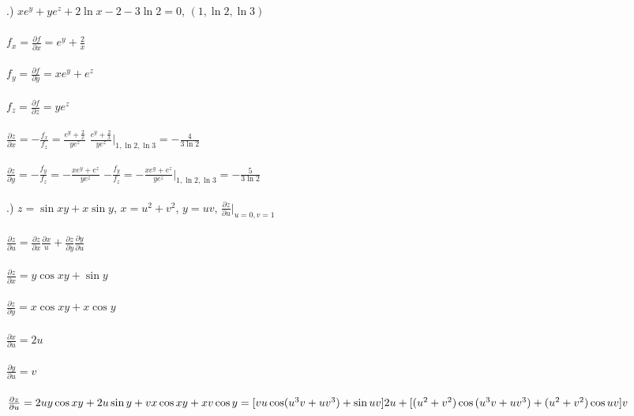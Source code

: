\documentclass[12pt]{article}
\begin{document}
.) $xe^{y} + ye^{z} + 2\ln{x}-2 -3\ln{2} = 0$, \hspace{10pt} $(1, \ln{2}, \ln{3})$\\\\
\noindent $f_{x} = \frac{\partial f}{\partial x} = e^{y}+\frac{2}{x}$\\\\
\noindent $f_{y} = \frac{\partial f}{\partial y} = xe^{y}+e^{z}$\\\\
\noindent $f_{z} = \frac{\partial f}{\partial z} = ye^{z}$\\\\
\noindent $\frac{\partial z}{\partial x} = -\frac{f_{x}}{f_{z}} = \frac{e^{y}+\frac{2}{x}}{ye^{z}}$
\noindent $\frac{e^{y}+\frac{2}{x}}{ye^{z}}\Big|_{1, \ln{2}, \ln{3}} = -\frac{4}{3\ln{2}}$\\\\
\noindent $\frac{\partial z}{\partial y} = -\frac{f_{y}}{f_{z}} = -\frac{xe^{y}+e^{z}}{ye^{z}}$
\noindent $-\frac{f_{y}}{f_{z}} = -\frac{xe^{y}+e^{z}}{ye^{z}}\Big|_{1, \ln{2}, \ln{3}} = -\frac{5}{3\ln{2}}$\\\\

.)  \hspace{10pt}$z = \sin{xy} + x\sin{y}$, \hspace{10pt} $x = u^{2} 
+ v^{2}$, \hspace{10pt} $y = uv$, \hspace{10pt} $\frac{\partial z}{\partial u} \Big|_{u = 0, v=1}$\\\\
\noindent $\frac{\partial z}{\partial u} = \frac{\partial z}{\partial x}\frac{\partial x}{u} 
+ \frac{\partial z}{\partial y}\frac{\partial y}{\partial u}$\\\\
\noindent $\frac{\partial z}{\partial x} = y\cos{xy} + \sin{y}$\\\\
\noindent $\frac{\partial z}{\partial y} = x\cos{xy} + x\cos{y}$\\\\
\noindent $\frac{\partial x}{\partial u} = 2u$\\\\
\noindent $\frac{\partial y}{\partial u} = v$\\\\

\noindent $\frac{\partial z}{\partial u} = 2uy\cos{xy} + 2u\sin{y} + vx\cos{xy} + xv\cos{y}
\\\\= [vu\cos(u^{3}v + uv^{3}) + \sin{uv}]2u + [(u^{2}+v^{2})\cos{(u^{3}v + uv^{3}) + (u^{2} + v^{2})\cos{uv}}]v$\\\\
\end{document}
